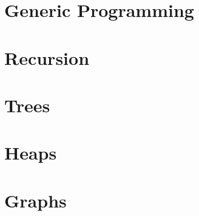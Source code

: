 \documentclass[c, aspectratio=169]{beamer}
\begin{document}
\section{Generic Programming}
\begin{frame}\end{frame}
\begin{frame}\end{frame}
\begin{frame}\end{frame}

\section{Recursion}
\begin{frame}\end{frame}
\begin{frame}\end{frame}
\begin{frame}\end{frame}

\section{Trees}
\begin{frame}\end{frame}
\begin{frame}\end{frame}
\begin{frame}\end{frame}

\section{Heaps}
\begin{frame}\end{frame}
\begin{frame}\end{frame}
\begin{frame}\end{frame}

\section{Graphs}
\begin{frame}\end{frame}
\begin{frame}\end{frame}
\begin{frame}\end{frame}
\end{document}
